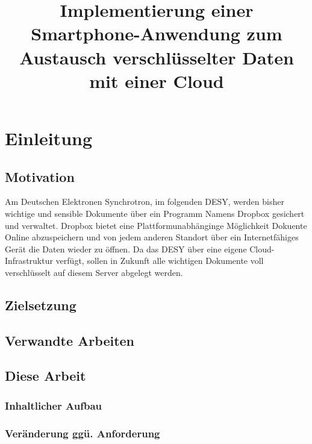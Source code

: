 \documentclass[11pt, a4paper]{scrreprt}
\title{Implementierung einer Smartphone-Anwendung zum Austausch verschlüsselter Daten mit einer Cloud}
\begin{document}
\titlepage
\maketitle
\tableofcontents



\part{Einleitung}
\chapter{Motivation}
Am Deutschen Elektronen Synchrotron, im folgenden DESY, werden bisher wichtige und sensible Dokumente über ein Programm Namens Dropbox gesichert und verwaltet. Dropbox bietet eine Plattformunabhänginge Möglichkeit Dokuente Online abzuspeichern und von jedem anderen Standort über ein Internetfähiges Gerät die Daten wieder zu öffnen.
Da das DESY über eine eigene Cloud-Infrastruktur verfügt, sollen in Zukunft alle wichtigen Dokumente voll verschlüsselt auf diesem Server abgelegt werden.

\chapter{Zielsetzung}
\chapter{Verwandte Arbeiten}
\chapter{Diese Arbeit}
\section{Inhaltlicher Aufbau}
\section{Veränderung ggü. Anforderung}

\end{document}

